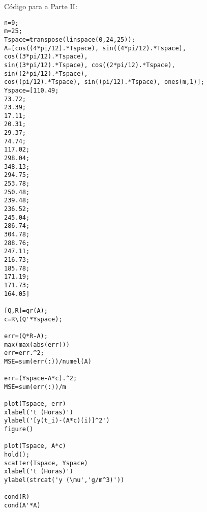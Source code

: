 \documentclass[a4paper, 12pt]{article}
\begin{document}
Código para a Parte II:
\begin{verbatim}
n=9;
m=25;
Tspace=transpose(linspace(0,24,25));
A=[cos((4*pi/12).*Tspace), sin((4*pi/12).*Tspace), cos((3*pi/12).*Tspace), 
sin((3*pi/12).*Tspace), cos((2*pi/12).*Tspace), sin((2*pi/12).*Tspace), 
cos((pi/12).*Tspace), sin((pi/12).*Tspace), ones(m,1)];
Yspace=[110.49; 
73.72; 
23.39; 
17.11; 
20.31; 
29.37; 
74.74; 
117.02; 
298.04; 
348.13; 
294.75; 
253.78; 
250.48; 
239.48; 
236.52; 
245.04; 
286.74; 
304.78; 
288.76; 
247.11; 
216.73; 
185.78; 
171.19; 
171.73; 
164.05]

[Q,R]=qr(A);
c=R\(Q'*Yspace);

err=(Q*R-A);
max(max(abs(err)))
err=err.^2;
MSE=sum(err(:))/numel(A)

err=(Yspace-A*c).^2;
MSE=sum(err(:))/m

plot(Tspace, err)
xlabel('t (Horas)')
ylabel('[y(t_i)-(A*c)(i)]^2')
figure()

plot(Tspace, A*c)
hold();
scatter(Tspace, Yspace)
xlabel('t (Horas)')
ylabel(strcat('y (\mu','g/m^3)'))

cond(R)
cond(A'*A)
\end{verbatim}
\end{document}

